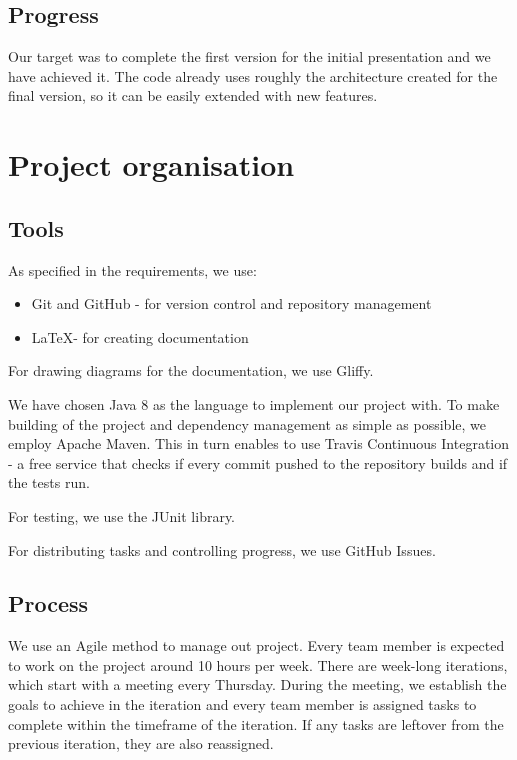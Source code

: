 \documentclass[a4paper,12pt]{article}
\begin{document}
\subsection{Progress}
Our target was to complete the first version for the initial presentation and we have achieved it. The code already uses roughly the architecture created for the final version, so it can be easily extended with new features.

\section{Project organisation}
\subsection{Tools}
As specified in the requirements, we use:
\begin{itemize}
    \item{Git and GitHub - for version control and repository management}
    \item{\LaTeX - for creating documentation}
\end{itemize}

For drawing diagrams for the documentation, we use Gliffy.

We have chosen Java 8 as the language to implement our project with. To make building of the project and dependency management as simple as possible, we employ Apache Maven. This in turn enables to use Travis Continuous Integration - a free service that checks if every commit pushed to the repository builds and if the tests run.

For testing, we use the JUnit library.

For distributing tasks and controlling progress, we use GitHub Issues.

\subsection{Process}
We use an Agile method to manage out project. Every team member is expected to work on the project around 10 hours per week. There are week-long iterations, which start with a meeting every Thursday. During the meeting, we establish the goals to achieve in the iteration and every team member is assigned tasks to complete within the timeframe of the iteration. If any tasks are leftover from the previous iteration, they are also reassigned.
\end{document}

